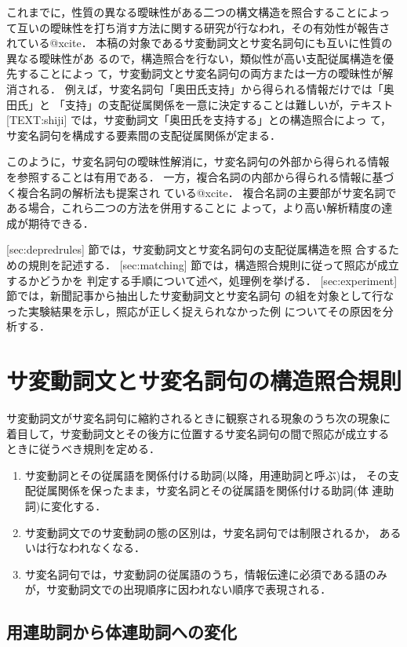 これまでに，性質の異なる曖昧性がある二つの構文構造を照合することによっ
て互いの曖昧性を打ち消す方法に関する研究が行なわれ，その有効性が報告さ
れている@xcite．
本稿の対象であるサ変動詞文とサ変名詞句にも互いに性質の異なる曖昧性があ
るので，構造照合を行ない，類似性が高い支配従属構造を優先することによっ
て，サ変動詞文とサ変名詞句の両方または一方の曖昧性が解消される．
例えば，サ変名詞句「奥田氏支持」から得られる情報だけでは「奥田氏」と
「支持」の支配従属関係を一意に決定することは難しいが，テキスト
[TEXT:shiji] では，サ変動詞文「奥田氏を支持する」との構造照合によっ
て，サ変名詞句を構成する要素間の支配従属関係が定まる．

このように，サ変名詞句の曖昧性解消に，サ変名詞句の外部から得られる情報
を参照することは有用である．
一方，複合名詞の内部から得られる情報に基づく複合名詞の解析法も提案され
ている@xcite．
複合名詞の主要部がサ変名詞である場合，これら二つの方法を併用することに
よって，より高い解析精度の達成が期待できる．

[sec:depredrules] 節では，サ変動詞文とサ変名詞句の支配従属構造を照
合するための規則を記述する．
[sec:matching] 節では，構造照合規則に従って照応が成立するかどうかを
判定する手順について述べ，処理例を挙げる．
[sec:experiment] 節では，新聞記事から抽出したサ変動詞文とサ変名詞句
の組を対象として行なった実験結果を示し，照応が正しく捉えられなかった例
についてその原因を分析する．

\section{サ変動詞文とサ変名詞句の構造照合規則}
\label{sec:depredrules}

サ変動詞文がサ変名詞句に縮約されるときに観察される現象のうち次の現象に
着目して，サ変動詞文とその後方に位置するサ変名詞句の間で照応が成立する
ときに従うべき規則を定める．
\begin{enumerate}
\item  サ変動詞とその従属語を関係付ける助詞(以降，用連助詞と呼ぶ)は，
その支配従属関係を保ったまま，サ変名詞とその従属語を関係付ける助詞(体
連助詞)に変化する．
\item サ変動詞文でのサ変動詞の態の区別は，サ変名詞句では制限されるか，
あるいは行なわれなくなる．
\item サ変名詞句では，サ変動詞の従属語のうち，情報伝達に必須である語のみ
が，サ変動詞文での出現順序に因われない順序で表現される．
\end{enumerate}

\subsection{用連助詞から体連助詞への変化}

